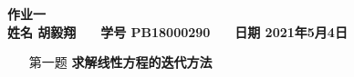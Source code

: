 \documentclass[12pt,a4paper,UTF8]{ctexart}
\begin{document}


\begin{center}
    \textbf{作业一}\\
    \textbf{姓名 胡毅翔 ~~ 学号 PB18000290 ~~ 日期 2021年5月4日}\\
\end{center}

\begin{center}
    \fbox{
        \begin{minipage}{40em}
            \vspace{5cm}
            \hspace{20cm}
        \end{minipage}}
\end{center}
\vspace{1cm}

\begin{enumerate}
    \item[第一题] \textbf{求解线性方程的迭代方法}


\end{enumerate}
\end{document}
